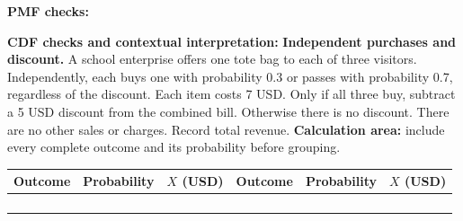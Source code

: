 \par%
\noindent%
\begin{minipage}[t]{.37\linewidth}%
\vspace{0pt}\centering
{}%
\end{minipage}%
\hfill%
\begin{minipage}[t]{.60\linewidth}%
\vspace{0pt}\centering
{}
\end{minipage}%
\par
\textbf{PMF checks:} \hrulefill%
\par
{}
\par%
\noindent%
\begin{minipage}[t]{.37\linewidth}%
\vspace{0pt}\centering
{}%
\end{minipage}%
\hfill%
\begin{minipage}[t]{.60\linewidth}%
\vspace{0pt}\centering
{}
\end{minipage}%
\par
\textbf{CDF checks and contextual interpretation:}
\vfill
\clearpage
{}
\textbf{Independent purchases and discount.} A school enterprise offers one tote bag to each of three
visitors. Independently, each buys one with probability 0.3 or passes with probability 0.7, regardless of the
discount. Each item costs 7 USD. Only if all three buy, subtract a 5 USD discount from the combined bill.
Otherwise there is no discount. There are no other sales or charges. Record total revenue.
\textbf{Calculation area:} include every complete outcome and its probability before grouping.
\par%
\noindent%
\begin{tabularx}{\linewidth}{|Y|Y|Y|Y|Y|Y|}%
\hline Outcome & Probability & $X$ (USD) & Outcome & Probability & $X$ (USD)\\%
\hline
\rule{0pt}{.63cm}& & & & & \\%
\hline
\rule{0pt}{.63cm}& & & & & \\%
\hline
\rule{0pt}{.63cm}& & & & & \\%
\hline
\rule{0pt}{.63cm}& & & & & \\%
\hline
\end{tabularx}
